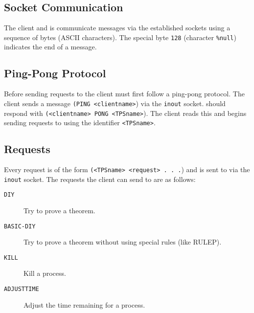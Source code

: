 \subsection{Socket Communication}

The client and {\TPS} is communicate messages via the established sockets
using a sequence of bytes (ASCII characters).  The special byte {\tt 128}
(character {\tt \%null}) indicates the end of a message.

\subsection{Ping-Pong Protocol}

Before sending requests to {\TPS} the client must first
follow a ping-pong protocol.  The client sends a message
{\tt (PING <clientname>}) via the {\tt inout} socket.
{\TPS} should respond with
{\tt (<clientname> PONG <TPSname>}).
The client reads this and begins sending requests to
{\TPS} using the identifier {\tt <TPSname>}.

\subsection{Requests}

Every request is of the form
{\tt (<TPSname> <request> . . .})
and is sent to {\TPS} via the {\tt inout} socket.
The requests the client can send to {\TPS} are as follows:
\begin{description}
\item[{\tt DIY}]	 Try to prove a theorem.

\item[{\tt BASIC-DIY}]	 Try to prove a theorem without using special rules (like RULEP).

\item[{\tt KILL}]	 Kill a {\TPS} process.

\item[{\tt ADJUSTTIME}]	  Adjust the time remaining for a {\TPS} process.
\end{description}

